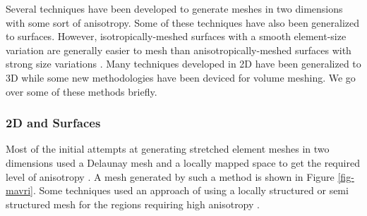 Several techniques have been developed to generate meshes in two dimensions with some sort of anisotropy. Some of these techniques have also been generalized to surfaces. However, isotropically-meshed surfaces with a smooth element-size variation are generally easier to mesh than anisotropically-meshed surfaces with strong size variations \cite{TU2013219}. Many techniques developed in 2D have been generalized to 3D while some new methodologies have been deviced for volume meshing. We go over some of these methods briefly.

\subsubsection{2D and Surfaces}

Most of the initial attempts at generating stretched element meshes in two dimensions used a Delaunay mesh and a locally mapped space to get the required level of anisotropy  \cite{mavriplis1990adaptive}. A mesh generated by such a method is shown in Figure \ref{fig-mavri}. Some techniques used an approach of using a locally structured or semi structured mesh for the regions requiring high anisotropy  \cite{nakahashi1987fdm}.

